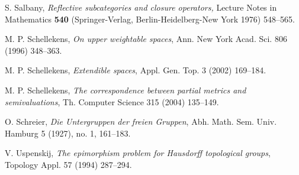 \documentclass[12pt]{article}
\theoremstyle{definition}
\numberwithin{equation}{section}
\begin{document}
\begin{thebibliography}{999}
{%




 S. Salbany, {\it Reflective subcategories and  closure operators,} {Lecture Notes in Mathematics} {\bf 540} (Springer-Verlag,
Berlin-Heidelberg-New  York 1976) 548--565.

 {M. P. Schellekens}, {\em On upper weightable spaces}, %
 Ann. New York Acad. Sci. 806 (1996) 348--363.

 {M. P. Schellekens}, {\em Extendible spaces}, Appl. Gen. Top. 3 (2002) 169--184.

 { M. P. Schellekens}, \textit{The correspondence between partial metrics and semivaluations}, Th. Computer Science 315 (2004) 135--149.

 O. Schreier, {\em Die Untergruppen der freien Gruppen}, Abh. Math. Sem. Univ. Hamburg 5 (1927), no. 1, 161--183.

 {V. Uspenskij}, \emph{The epimorphism problem for Hausdorff topological groups}, Topology Appl. 57 (1994) 287--294.

 
%
%
%     


}
\end{thebibliography}
\end{document}
